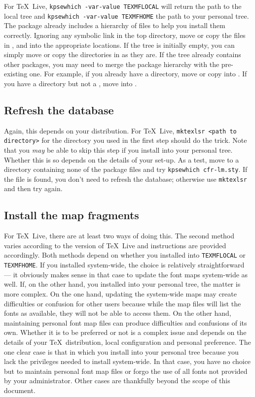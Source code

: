\documentclass[11pt,british,a4paper]{article}
\begin{document}
For \TeX~Live, \verb|kpsewhich -var-value TEXMFLOCAL| will return the path to the local tree and \verb|kpsewhich -var-value TEXMFHOME| the path to your personal tree. The package already includes a hierarchy of files to help you install them correctly. Ignoring any symbolic link in the top directory, move or copy the files in ,  and  into the appropriate locations. If the tree is initially empty, you can simply move or copy the directories in as they are. If the tree already contains other packages, you may need to merge the package hierarchy with the pre-existing one. For example, if you already have a  directory, move or copy  into . If you have a  directory but not a , move  into .

\subsection{Refresh the database}

Again, this depends on your distribution. For \TeX~Live, \verb|mktexlsr <path to directory>| for the directory you used in the first step should do the trick. Note that you \emph{may} be able to skip this step if you install into your personal tree. Whether this is so depends on the details of your set-up. As a test, move to a directory containing none of the package files and try \verb|kpsewhich cfr-lm.sty|. If the file is found, you don't need to refresh the database; otherwise use \verb|mktexlsr| and then try again.

\subsection{Install the map fragments}

For \TeX~Live, there are at least two ways of doing this. The second method varies according to the version of \TeX~Live and instructions are provided accordingly. Both methods depend on whether you installed into \verb|TEXMFLOCAL| or \verb|TEXMFHOME|. If you installed system-wide, the choice is relatively straightforward --- it obviously makes sense in that case to update the font maps system-wide as well. If, on the other hand, you installed into your personal tree, the matter is more complex. On the one hand, updating the system-wide maps may create difficulties or confusion for other users because while the map files will list the fonts as available, they will not be able to access them. On the other hand, maintaining personal font map files can produce difficulties and confusions of its own. Whether it is to be preferred or not is a complex issue and depends on the details of your \TeX\ distribution, local configuration and personal preference. The one clear case is that in which you install into your personal tree because you lack the privileges needed to install system-wide. In that case, you have no choice but to maintain personal font map files or forgo the use of all fonts not provided by your administrator. Other cases are thankfully beyond the scope of this document.
\end{document}
